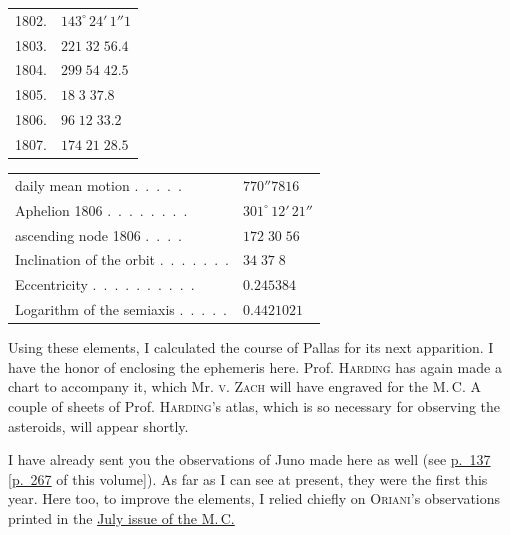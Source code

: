 \begin{center}\begingroup
\fontsize{9}{11}\selectfont
\setlength{\tabcolsep}{3pt}\renewcommand{\arraystretch}{1.12}
\begin{tabular}{ll}
1802.  & $143^\circ\,24'\,1''1$ \\
1803.  & $221\;32\;56.4$ \\
1804.  & $299\;54\;42.5$ \\
1805.  & $18\;3\;37.8$ \\
1806.  & $96\;12\;33.2$ \\
1807.  & $174\;21\;28.5$ \\
\end{tabular}\endgroup\end{center}
\begin{center}\begingroup
\fontsize{9}{11}\selectfont
\setlength{\tabcolsep}{3pt}\renewcommand{\arraystretch}{1.12}
\begin{tabular}{ll}
daily mean motion .\ .\ .\ .\ . & $770''7816$ \\
Aphelion 1806 .\ .\ .\ .\ .\ .\ .\ . & $301^\circ\,12'\,21''$ \\
ascending node 1806 .\ .\ .\ . & $172\;30\;56$ \\
Inclination of the orbit .\ .\ .\ .\ .\ .\ . & $34\;37\;8$ \\
Eccentricity .\ .\ .\ .\ .\ .\ .\ .\ .\ . & $0.245384$ \\
Logarithm of the semiaxis .\ .\ .\ .\ . & $0.4421021$ \\
\end{tabular}\endgroup\end{center}
%
\par\indent Using these elements, I calculated the course of Pallas for its next apparition. I have the honor of enclosing the ephemeris here. Prof. \textsc{Harding} has again made a chart to accompany it, which Mr. \textsc{v. Zach} will have engraved for the M.\,C. A couple of sheets of Prof. \textsc{Harding}’s atlas, which is so necessary for observing the asteroids, will appear shortly.

\par\indent I have already sent you the observations of Juno made here as well (see \href{https://www.digitale-sammlungen.de/en/view/bsb10538338?page=147}{p.~137} [\hyperlink{native-272}{p.~267} of this volume]). As far as I can see at present, they were the first this year. Here too, to improve the elements, I relied chiefly on \textsc{Oriani}’s observations printed in the \href{https://www.digitale-sammlungen.de/en/view/bsb10538606?page=98}{July issue of the M.\,C.}

